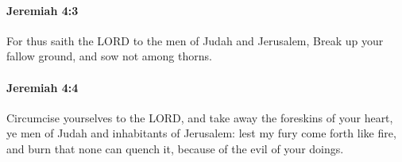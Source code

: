 		\paragraph{Jeremiah 4:3} %
			\label{JEREMIAH-4-3}

			For thus saith the LORD to the men of Judah and Jerusalem, Break up your fallow ground, and sow not among thorns.


		\paragraph{Jeremiah 4:4} %
			\label{JEREMIAH-4-4}

			Circumcise yourselves to the LORD, and take away the foreskins of your heart, ye men of Judah and inhabitants of Jerusalem: lest my fury come forth like fire, and burn that none can quench it, because of the evil of your doings.


